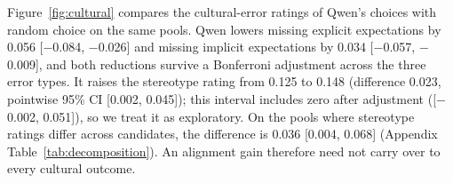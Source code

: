 Figure~\ref{fig:cultural} compares the cultural-error ratings of Qwen's choices with random choice on the same pools. Qwen lowers missing explicit expectations by 0.056 [$-$0.084, $-$0.026] and missing implicit expectations by 0.034 [$-$0.057, $-$0.009], and both reductions survive a Bonferroni adjustment across the three error types. It raises the stereotype rating from 0.125 to 0.148 (difference 0.023, pointwise 95\% CI [0.002, 0.045]); this interval includes zero after adjustment ([$-$0.002, 0.051]), so we treat it as exploratory. On the pools where stereotype ratings differ across candidates, the difference is 0.036 [0.004, 0.068] (Appendix Table~\ref{tab:decomposition}). An alignment gain therefore need not carry over to every cultural outcome.
